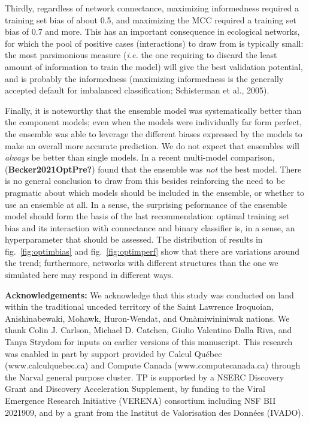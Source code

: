 \documentclass[11pt]{article}
\begin{document}
Thirdly, regardless of network connectance, maximizing informedness
required a training set bias of about 0.5, and maximizing the MCC
required a training set bias of 0.7 and more. This has an important
consequence in ecological networks, for which the pool of positive cases
(interactions) to draw from is typically small: the most parsimonious
measure (\emph{i.e.} the one requiring to discard the least amount of
information to train the model) will give the best validation potential,
and is probably the informedness (maximizing informedness is the
generally accepted default for imbalanced classification; Schisterman et
al., 2005).

Finally, it is noteworthy that the ensemble model was systematically
better than the component models; even when the models were individually
far form perfect, the ensemble was able to leverage the different biases
expressed by the models to make an overall more accurate prediction. We
do not expect that ensembles will \emph{always} be better than single
models. In a recent multi-model comparison, (\textbf{Becker2021OptPre?})
found that the ensemble was \emph{not} the best model. There is no
general conclusion to draw from this besides reinforcing the need to be
pragmatic about which models should be included in the ensemble, or
whether to use an ensemble at all. In a sense, the surprising peformance
of the ensemble model should form the basis of the last recommendation:
optimal training set bias and its interaction with connectance and
binary classifier is, in a sense, an hyperparameter that should be
assessed. The distribution of results in fig.~\ref{fig:optimbias} and
fig.~\ref{fig:optimperf} show that there are variations around the
trend; furthermore, networks with different structures than the one we
simulated here may respond in different ways.

\textbf{Acknowledgements:} We acknowledge that this study was conducted
on land within the traditional unceded territory of the Saint Lawrence
Iroquoian, Anishinabewaki, Mohawk, Huron-Wendat, and Omàmiwininiwak
nations. We thank Colin J. Carlson, Michael D. Catchen, Giulio Valentino
Dalla Riva, and Tanya Strydom for inputs on earlier versions of this
manuscript. This research was enabled in part by support provided by
Calcul Québec (www.calculquebec.ca) and Compute Canada
(www.computecanada.ca) through the Narval general purpose cluster. TP is
supported by a NSERC Discovery Grant and Discovery Acceleration
Supplement, by funding to the Viral Emergence Research Initiative
(VERENA) consortium including NSF BII 2021909, and by a grant from the
Institut de Valorisation des Données (IVADO).
\end{document}
